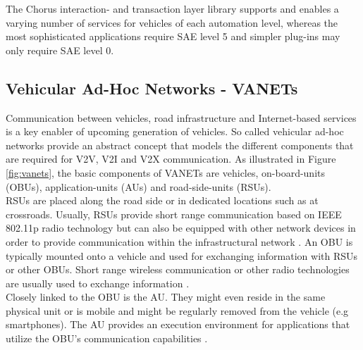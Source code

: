 \documentclass{llncs}
\begin{document}
{			The Chorus interaction- and transaction layer library supports and enables a varying number of services for vehicles of each automation level, whereas the most sophisticated applications require SAE level 5 and simpler plug-ins may only require SAE level 0.

		
		\subsection{Vehicular Ad-Hoc Networks - VANETs}
			\label{ss:vanets}

			Communication between vehicles, road infrastructure and Internet-based services is a key enabler of upcoming generation of vehicles. So called vehicular ad-hoc networks provide an abstract concept that models the different components that are required for V2V, V2I and V2X communication. As illustrated in Figure \ref{fig:vanets}, the basic components of VANETs are vehicles, on-board-units (OBUs), application-units (AUs) and road-side-units (RSUs).\\
			RSUs are placed  along the road side or in dedicated locations such as at crossroads. Usually, RSUs provide short range communication based on IEEE 802.11p radio technology but can also be equipped with other network devices in order to provide communication within the infrastructural network \cite{al2014comprehensive}. An OBU is typically mounted onto a vehicle and used for exchanging information with RSUs or other OBUs. Short range wireless communication or other radio technologies are usually used to exchange information \cite{baldessari2007car}.\\
			Closely linked to the OBU is the AU. They might even reside in the same physical unit or is mobile and might be regularly removed from the vehicle (e.g smartphones). The AU provides an execution environment for applications that utilize the OBU's communication capabilities \cite{al2014comprehensive}\cite{baldessari2007car}.\\	
			\begin{figure}[ht]
				\centering

\end{figure}}
\end{document}
